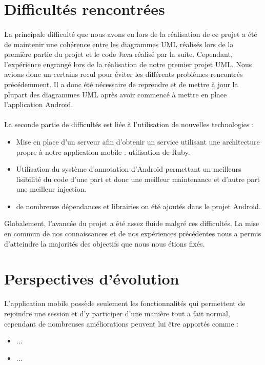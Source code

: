 \documentclass[titlepage, 12pt]{report}
\begin{document}
\section{Difficultés rencontrées}

\paragraph{}La principale difficulté que nous avons eu lors de la réalisation de ce projet a été de maintenir une cohérence entre les diagrammes UML réalisés lors de la première partie du projet et le code Java réalisé par la suite. Cependant, l'expérience engrangé lors de la réalisation de notre premier projet UML. Nous avions donc un certains recul pour éviter les différents problèmes rencontrés précédemment.
Il a donc été nécessaire de reprendre et de mettre à jour la plupart des diagrammes UML après avoir commencé à mettre en place l'application Android.

\paragraph{}La seconde partie de difficultés est liée à l'utilisation de nouvelles technologies :
\begin{itemize}
	\item Mise en place d'un serveur afin d'obtenir un service utilisant une architecture propre à notre application mobile : utilisation de Ruby.
	\item Utilisation du système d'annotation d'Android permettant un meilleurs lisibilité du code d'une part et donc une meilleur maintenance et d'autre part une meilleur injection.
	\item de nombreuse dépendances et librairies on été ajoutés dans le projet Android. 
\end{itemize}

Globalement, l'avancée du projet a été assez fluide malgré ces difficultés. La mise en commun de nos connaissances et de nos expériences précédentes nous a permis d'atteindre la majorités des objectifs que nous nous étions fixés.

\section{Perspectives d'évolution}

L'application mobile possède seulement les fonctionnalités qui permettent de rejoindre une session et d'y participer d'une manière tout a fait normal, cependant de nombreuses améliorations peuvent lui être apportés comme :
\begin{itemize}
	\item ...
	\item ...
\end{itemize}
\end{document}
